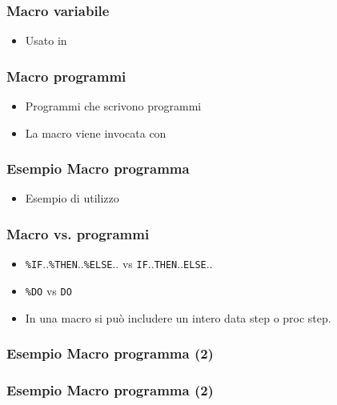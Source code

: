 \begin{frame}[containsverbatim]\frametitle{Macro variabile}
  \begin{itemize}
  \item
    Usato in
  \end{itemize}
\end{frame}


\begin{frame}[containsverbatim]\frametitle{Macro programmi}
  \begin{itemize}
  \item
    Programmi che scrivono programmi
  \end{itemize}
  \begin{itemize}
  \item
    La macro viene invocata con
  \end{itemize}
\end{frame}

\begin{frame}[containsverbatim]\frametitle{Esempio Macro programma}
  \begin{itemize}
  \item
    Esempio di utilizzo
  \end{itemize}
\end{frame}





\begin{frame}[containsverbatim]\frametitle{Macro vs. programmi}
  \begin{itemize}
  \item
    \verb+%IF+..\verb+%THEN+..\verb+%ELSE+.. vs \verb+IF+..\verb+THEN+..\verb+ELSE+..
  \item
    \verb+%DO+ vs \verb+DO+
  \item
    In una macro si pu{\`o} includere un intero data step o proc step.
  \end{itemize}
\end{frame}

\begin{frame}[containsverbatim]\frametitle{Esempio Macro programma (2)}
\end{frame}

\begin{frame}[containsverbatim]\frametitle{Esempio Macro programma (2)}
\end{frame}


